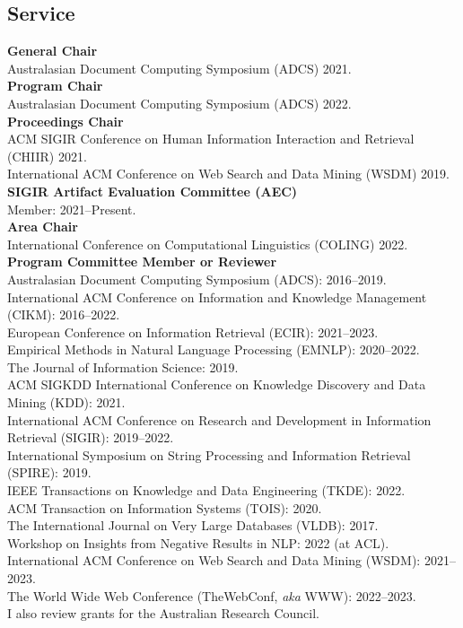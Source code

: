 \documentclass[line]{res}
\begin{document}
\begin{resume}
\section{Service}
{\bf General Chair}\\
  Australasian Document Computing Symposium (ADCS) 2021.\\[1.2ex]
{\bf Program Chair}\\
  Australasian Document Computing Symposium (ADCS) 2022.\\[1.2ex]
{\bf Proceedings Chair}\\
      ACM SIGIR Conference on Human Information Interaction and Retrieval (CHIIR) 2021.\\
      International ACM Conference on Web Search and Data Mining (WSDM) 2019.\\[1.2ex]
{\bf{SIGIR Artifact Evaluation Committee (AEC)}}\\
Member: 2021--Present.\\[1.2ex]
{\bf{Area Chair}}\\
International Conference on Computational Linguistics (COLING) 2022.\\[1.2ex]
{\bf Program Committee Member or Reviewer}\\
Australasian Document Computing Symposium (ADCS): 2016--2019.\\
International ACM Conference on Information and Knowledge Management (CIKM): 2016--2022.\\
European Conference on Information Retrieval (ECIR): 2021--2023.\\
Empirical Methods in Natural Language Processing (EMNLP): 2020--2022.\\
The Journal of Information Science: 2019.\\
ACM SIGKDD International Conference on Knowledge Discovery and Data Mining (KDD): 2021.\\
International ACM Conference on Research and Development in Information Retrieval (SIGIR): 2019--2022.\\
International Symposium on String Processing and Information Retrieval (SPIRE): 2019.\\
IEEE Transactions on Knowledge and Data Engineering (TKDE): 2022.\\
ACM Transaction on Information Systems (TOIS): 2020. \\ 
The International Journal on Very Large Databases (VLDB): 2017.\\
Workshop on Insights from Negative Results in NLP: 2022 (at ACL).\\
International ACM Conference on Web Search and Data Mining (WSDM): 2021--2023.\\
The World Wide Web Conference (TheWebConf, {\emph{aka}} WWW): 2022--2023.\\[1.2ex]
I also review grants for the Australian Research Council.


\end{resume}
\end{document}
